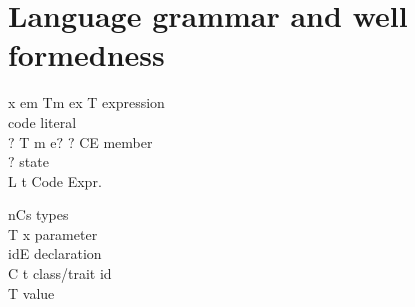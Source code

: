 \section{Language grammar and well formedness}
\begin{minipage}{0.63\textwidth}
\begin{bnf}
      {x \mmid{} em \mmid{}Tm
\mmid{} ex \mmid{}  T
}{expression}\\      {
\mmid{} 
}        {code literal}\\      {$?$ T m e$?$ \mmid{} $?$ C\eq{}E }                                                    {member}\\      {$?$}                                          {state}\\      {L \mmid{} t \mmid{}  \mmid{} }           {Code Expr.}%
\end{bnf}
\end{minipage}
\begin{minipage}[t]{0.5\textwidth}
\begin{bnf}
      {nCs}                                                 {types}\\     {T x}                                                              {parameter}\\      {id\eq{}E}                                                         {declaration}\\     {C \mmid{} t}                                                      {class/trait id}\\      { T}                                                 {value}%
\end{bnf}
\end{minipage}


